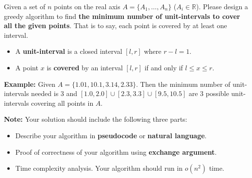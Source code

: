 \problem{}
Given a set of $n$ points on the real axis $A=\{ A_1,\ldots,A_n\}$ ($A_i\in\mathbb{R}$). Please design
a greedy algorithm to find \textbf{the minimum number of unit-intervals to cover all the given points}. That is to say, each point is covered by at least one interval.

\begin{itemize}
	\item A \textbf{unit-interval} is a closed interval $[l,r]$ where $r-l=1$. 
	\item A point $x$ is \textbf{covered} by an interval $[l,r]$ if and only if $l \leq x \leq r$.
\end{itemize}

\textbf{Example:} 
Given $A = \{ 1.01, 10.1, 3.14, 2.33\}$. Then the minimum number of unit-intervals needed is $3$ and $[1.0, 2.0] \cup  [2.3, 3.3] \cup [9.5, 10.5]$ are $3$ possible unit-intervals covering all points in $A$.

\textbf{Note:} 
Your solution should include the following three parts:
\begin{itemize}
    \item Describe your algorithm in \textbf{pseudocode} or \textbf{natural language}.
    \item Proof of correctness of your algorithm using \textbf{exchange argument}.
    \item Time complexity analysis. Your algorithm should run in $o(n^2)$ time.
\end{itemize}

\solution{
}

\newpage